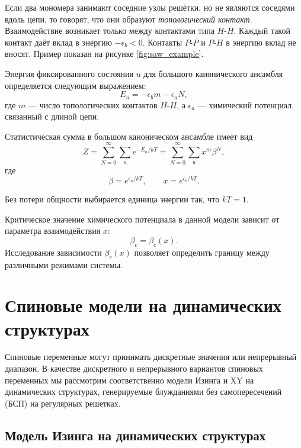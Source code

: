  
 Если два мономера занимают соседние узлы решётки, но не являются соседями вдоль цепи, то говорят, что они образуют \textit{топологический контакт}. Взаимодействие возникает только между контактами типа $H$-$H$. Каждый такой контакт даёт вклад в энергию $-\epsilon_b<0$. Контакты $P$-$P$ и $P$-$H$ в энергию  вклад не вносят. Пример показан на рисунке \ref{fig:saw_example}. 
 
 Энергия фиксированного состояния  $u$ для большого канонического ансамбля  определяется следующим выражением: 
 \begin{equation}
 	E_u = -\epsilon_b m - \epsilon_a N,
 \end{equation}
 где $m$ --- число топологических контактов $H$-$H$, а $\epsilon_a$ --- химический потенциал, связанный с длиной цепи.
 
 Статистическая сумма в большом каноническом ансамбле имеет вид
 \begin{equation}
 	Z=\sum_{N=0}^{\infty}\sum_u e^{-E_u/kT}
 	= \sum_{N=0}^{\infty}\sum_u x^m \beta^N,
 \end{equation}
 где
 \begin{equation}
 	\beta = e^{\epsilon_a/kT}, \qquad x=e^{\epsilon_b/kT}.
 \end{equation}
 
Без потери общности выбирается единица энергии так, что $kT=1$.
  
  Критическое значение химического потенциала  в данной модели зависит от параметра взаимодействия $x$:
  \begin{equation}
  	\beta_c=\beta_c(x).
  \end{equation}
  Исследование зависимости $\beta_c(x)$ позволяет определить границу между различными режимами системы. 
 
 
\section{ Спиновые модели  на динамических структурах}\label{sec:1_ch:1}
 
Спиновые переменные могут принимать дискретные значения или непрерывный диапазон.  
В качестве дискретного и непрерывного вариантов спиновых переменных мы рассмотрим соответственно модели Изинга и XY на динамических структурах, генерируемые блужданиями без самопересечений (БСП) на регулярных решетках. 
 
 \subsection{  Модель Изинга на динамических структурах}\label{sub1:sec:1_ch:1}
 


